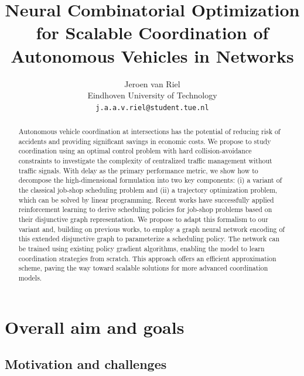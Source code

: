 \documentclass{article}
\title{Neural Combinatorial Optimization for Scalable Coordination of Autonomous
  Vehicles in Networks}
\author{
 Jeroen van Riel \\
Eindhoven University of Technology\\
  \texttt{j.a.a.v.riel@student.tue.nl} \\
}
\theoremstyle{definition}
\theoremstyle{plain}
\begin{document}
\maketitle

\begin{abstract}
  Autonomous vehicle coordination at intersections has the potential of reducing
  risk of accidents and providing significant savings in economic costs.
  We propose to study coordination using an optimal control problem with hard
  collision-avoidance constraints to investigate the complexity of centralized
  traffic management without traffic signals.
  With delay as the primary performance metric, we show how to decompose the
  high-dimensional formulation into two key components: (i) a variant of the
  classical job-shop scheduling problem and (ii) a trajectory optimization
  problem, which can be solved by linear programming.
  Recent works have successfully applied reinforcement learning to derive
  scheduling policies for job-shop problems based on their disjunctive graph
  representation.
  We propose to adapt this formalism to our variant and, building on previous
  works, to employ a graph neural network encoding of this extended disjunctive
  graph to parameterize a scheduling policy. The network can be trained using
  existing policy gradient algorithms, enabling the model to learn coordination
  strategies from scratch.
  This approach offers an efficient approximation scheme, paving the way toward
  scalable solutions for more advanced coordination models.
\end{abstract}


\section{Overall aim and goals}

\subsection{Motivation and challenges}
\label{sec:motivation}
\end{document}
